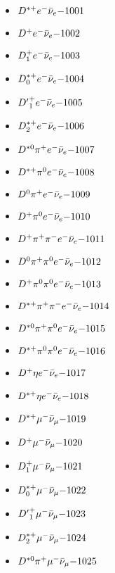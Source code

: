 
 \begin{multicols}{3} 
 \begin{itemize}
 \item $ D^{*+} e^{-} \bar{\nu}_{e} \hfill{-1001}$
 \item $ D^{+} e^{-} \bar{\nu}_{e} \hfill{-1002}$
 \item $ D_{1}^{+} e^{-} \bar{\nu}_{e} \hfill{-1003}$
 \item $ D_{0}^{*+} e^{-} \bar{\nu}_{e} \hfill{-1004}$
 \item $ {D^{\prime}}_{1}^{+} e^{-} \bar{\nu}_{e} \hfill{-1005}$
 \item $ D_{2}^{*+} e^{-} \bar{\nu}_{e} \hfill{-1006}$
 \item $ D^{*0} \pi^{+} e^{-} \bar{\nu}_{e} \hfill{-1007}$
 \item $ D^{*+} \pi^{0} e^{-} \bar{\nu}_{e} \hfill{-1008}$
 \item $ D^{0} \pi^{+} e^{-} \bar{\nu}_{e} \hfill{-1009}$
 \item $ D^{+} \pi^{0} e^{-} \bar{\nu}_{e} \hfill{-1010}$
 \item $ D^{+} \pi^{+} \pi^{-} e^{-} \bar{\nu}_{e} \hfill{-1011}$
 \item $ D^{0} \pi^{+} \pi^{0} e^{-} \bar{\nu}_{e} \hfill{-1012}$
 \item $ D^{+} \pi^{0} \pi^{0} e^{-} \bar{\nu}_{e} \hfill{-1013}$
 \item $ D^{*+} \pi^{+} \pi^{-} e^{-} \bar{\nu}_{e} \hfill{-1014}$
 \item $ D^{*0} \pi^{+} \pi^{0} e^{-} \bar{\nu}_{e} \hfill{-1015}$
 \item $ D^{*+} \pi^{0} \pi^{0} e^{-} \bar{\nu}_{e} \hfill{-1016}$
 \item $ D^{+} \eta e^{-} \bar{\nu}_{e} \hfill{-1017}$
 \item $ D^{*+} \eta e^{-} \bar{\nu}_{e} \hfill{-1018}$
 \item $ D^{*+} \mu^{-} \bar{\nu}_{\mu} \hfill{-1019}$
 \item $ D^{+} \mu^{-} \bar{\nu}_{\mu} \hfill{-1020}$
 \item $ D_{1}^{+} \mu^{-} \bar{\nu}_{\mu} \hfill{-1021}$
 \item $ D_{0}^{*+} \mu^{-} \bar{\nu}_{\mu} \hfill{-1022}$
 \item $ {D^{\prime}}_{1}^{+} \mu^{-} \bar{\nu}_{\mu} \hfill{-1023}$
 \item $ D_{2}^{*+} \mu^{-} \bar{\nu}_{\mu} \hfill{-1024}$
 \item $ D^{*0} \pi^{+} \mu^{-} \bar{\nu}_{\mu} \hfill{-1025}$

\end{itemize}
\end{multicols}
